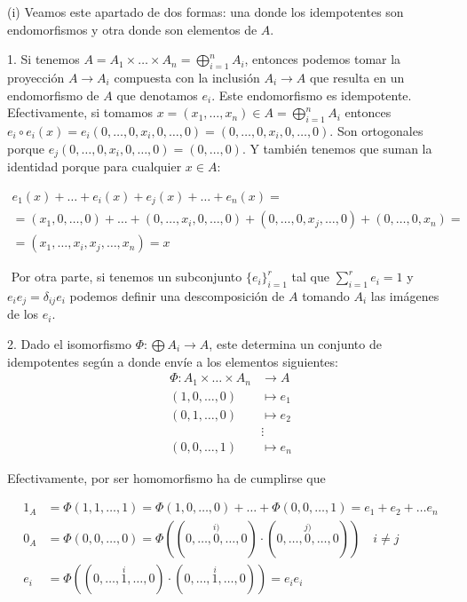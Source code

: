 \documentclass[../main.tex]{subfiles}
\begin{document}
(i) Veamos este apartado de dos formas: una donde los idempotentes son endomorfismos y otra donde son elementos de $A$.

1. Si tenemos $A = A_1\times \dots \times A_n = \bigoplus_{i=1}^n A_i$, entonces podemos tomar la proyección $A\to A_i$ compuesta con la inclusión $A_i \to A$ que resulta en un endomorfismo de $A$ que denotamos $e_i$. Este endomorfismo es idempotente. Efectivamente, si tomamos $x=(x_1,\dots,x_n)\in A = \bigoplus_{i=1}^n A_i$ entonces $e_i\circ e_i(x) = e_i(0,\dots,0,x_i,0,\dots,0) = (0,\dots,0,x_i,0,\dots,0)$. Son ortogonales porque $e_j(0,\dots,0,x_i,0,\dots,0) = (0,\dots, 0)$. Y también tenemos que suman la identidad porque para cualquier $x\in A$:

\begin{multline}
e_1(x)+\ldots+e_i(x)+e_j(x)+\ldots +e_n(x)=\\=(x_1,0,\dots,0)+\dots+(0,\dots,x_i,0,\dots,0)+(0,\dots,0,x_j,\dots,0)+ (0,\dots,0,x_n) =\\= (x_1,\dots,x_i,x_j,\dots,x_n) = x
\end{multline}

​	Por otra parte, si tenemos un subconjunto $\{e_i\}_{i=1}^r$ tal que  $\sum_{i=1}^r e_i = 1$ y $e_ie_j=\delta_{ij}e_i$ podemos definir una descomposición de 	$A$ tomando $A_i$ las imágenes de los $e_i$.

2. Dado el isomorfismo $\Phi:\bigoplus A_i \to A$, este determina un conjunto de idempotentes según a donde envíe a los elementos siguientes:
\begin{align*}
\Phi: A_1\times\ldots \times A_n &\to A\\
(1,0,\dots,0)&\mapsto e_1\\
(0,1,\dots,0)&\mapsto e_2\\
&\vdots\\
(0,0,\dots,1)&\mapsto e_n
\end{align*}

Efectivamente, por ser homomorfismo ha de cumplirse que

\begin{align}
   1_A&=\Phi(1,1,\dots,1) = \Phi(1,0,\ldots,0)+\dots+\Phi(0,0,\ldots, 1) = e_1+e_2+\ldots e_n\\
   0_A &= \Phi(0,0,\dots,0) = \Phi((0,\dots,\overset{i)}{0},\dots,0)\cdot (0,\dots,\overset{j)}{0},\dots,0)) \quad i\neq j\\
   e_i &= \Phi((0,\dots,\overset{i}{1},\ldots,0)\cdot(0,\dots,\overset{i}{1},\ldots,0)) = e_ie_i
\end{align}
\end{document}
